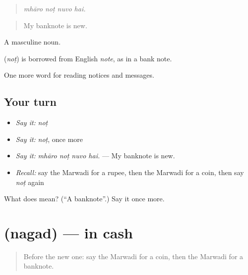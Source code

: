 \begin{quote}
   
\end{quote}

\begin{quote}
\emph{mhāro noṭ nuvo hai.}
\end{quote}

\begin{quote}
My banknote is new.
\end{quote}

A masculine noun.

\begin{cousinweb}
\textbf{} (\emph{noṭ}) is borrowed from English \emph{note}, as in a bank note.
\end{cousinweb}

\begin{grammarlens}[title={What you've built}]
One more word for reading notices and messages.
\end{grammarlens}

\subsection*{Your turn}
\begin{itemize}
\raggedright
  \item \emph{Say it:} \emph{noṭ}
  \item \emph{Say it:} \emph{noṭ}, once more
  \item \emph{Say it:} \emph{mhāro noṭ nuvo hai.} — My banknote is new.
  \item \emph{Recall:} say the Marwadi for a rupee, then the Marwadi for a coin, then say \emph{noṭ} again
\end{itemize}

\begin{tcolorbox}[breakable,colback=teal!4,colframe=teal!35!black,title={Before you move on}]
What does  mean? (\textquotedblleft{}A banknote\textquotedblright{}.) Say it once more.
\end{tcolorbox}
\section[\texorpdfstring{\mw{नगद} (nagad)}{नगद (nagad)}]{ (nagad) — in cash}

\label{lesson:MW-C193-nagad}



\begin{quote}
Before the new one: say the Marwadi for a coin, then the Marwadi for a banknote.
\end{quote}

